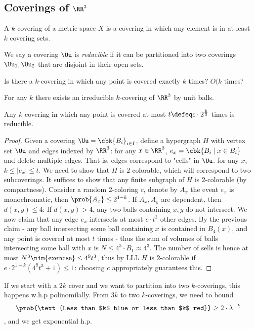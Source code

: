 \documentclass[a4paper, 11pt, oneside]{book}
\begin{document}
\subsection{Coverings of $\RR^3$}
\begin{yellowBox}
	\begin{defn}
		[$k$-covering] A $k$ covering of a metric space $X$ is a covering in which any element is in at least $k$ covering sets.
	\end{defn}
	\begin{defn}
		[Reducible] We say a covering $\Uu$ is \emph{reducible} if it can be partitioned into two coverings $\Uu_1,\Uu_2$ that are disjoint in their open sets.
	\end{defn}
\end{yellowBox}
\begin{question}
	Is there a $k$-covering in which any point is covered exactly $k$ times? $O(k$ times?
\end{question}
\begin{thm}
	 For any $k$ there exists an irreducible $k$-covering of $\RR^3$ by unit balls.
\end{thm}
\begin{thm}
	Any $k$ covering in which any point is covered at most $t\defeq c\cdot 2^{\frac{k}{3}}$ times is reducible.
\end{thm}
\begin{proof}
	Given a covering $\Uu = \cbk{B_i}_{i\in I}$, define a hypergraph $H$ with vertex set $\Uu$ and edges indexed by $\RR^3$: for any $x\in \RR^3$, $e_x = \cbk{B_i\mid x\in B_i}$ and delete multiple edges. That is, edges correspond to "cells" in $\Uu$. for any $x$, $k\le |e_x|\le t$. We need to show that $H$ is $2$ colorable, which will correspond to two subcoverings. It suffices to show that any finite subgraph of $H$ is $2$-colorable (by compactness). Consider a random $2$-coloring $c$, denote by $A_x$ the event $e_x$ is monochromatic, then $\prob{A_x}\le 2^{1-k}$. If $A_x,A_y$ are dependent, then $d(x,y) \le 4$: If $d(x,y) > 4$, any two balls containing $x,y$ do not intersect. We now claim that any edge $e_x$ intersects at most $c\cdot t^3$ other edges. By the previous claim - any ball intersecting some ball containing $x$ is contained in $ B_4(x)$, and any point is covered at most $t$ times - thus the sum of volumes of balls intersecting some ball with $x$ is $N \le 4^3\cdot B_1 \approx 4^3$. The number of sells is hence at most $N^3\nim{\text{exercise}}\le 4^9t^3$, thus by LLL $H$ is $2$-colorable if $e\cdot 2^{1-k}(4^9t^3 + 1)\le 1$: choosing $c$ appropriately guarantees this.
\end{proof}
\begin{remark}
	If we start with a $2k$ cover and we want to partition into two $k$-coverings, this happens w.h.p polinomilally. From $3k$ to two $k$-coverings, we need to bound $$\prob{\text{Less than $k$ blue or less than $k$ red}} \ge 2\cdot \lambda^{-k}$$, and we get exponential h.p.
\end{remark}
\end{document}
